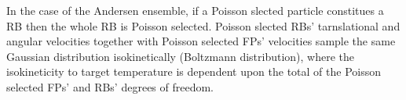 In the case of the Andersen ensemble, if a Poisson slected particle constitues a RB then the whole
RB is Poisson selected.  Poisson slected RBs' tarnslational and angular velocities together with
Poisson selected FPs' velocities sample the same Gaussian distribution isokinetically
(Boltzmann distribution), where the isokineticity to target temperature is dependent upon the
total of the Poisson selected FPs' and RBs' degrees of freedom.
